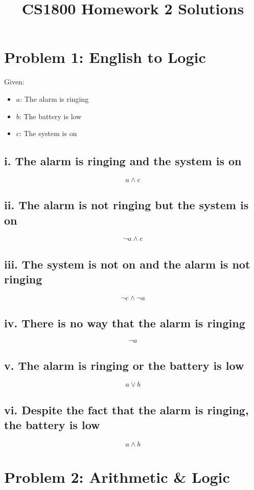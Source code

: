 \documentclass{article}
\title{CS1800 Homework 2 Solutions}
\author{}
\date{}
\begin{document}
\maketitle
\newpage

\section*{Problem 1: English to Logic}

Given:
\begin{itemize}
    \item $a$: The alarm is ringing
    \item $b$: The battery is low
    \item $c$: The system is on
\end{itemize}

\subsection*{i. The alarm is ringing and the system is on}
\[
a \land c
\]

\subsection*{ii. The alarm is not ringing but the system is on}
\[
\neg a \land c
\]

\subsection*{iii. The system is not on and the alarm is not ringing}
\[
\neg c \land \neg a
\]

\subsection*{iv. There is no way that the alarm is ringing}
\[
\neg a
\]

\subsection*{v. The alarm is ringing or the battery is low}
\[
a \lor b
\]

\subsection*{vi. Despite the fact that the alarm is ringing, the battery is low}
\[
a \land b
\]
\newpage

\section*{Problem 2: Arithmetic \& Logic}
\end{document}
